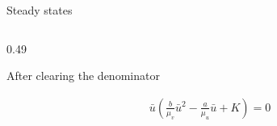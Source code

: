 \begin{frame}{Steady states}
\begin{columns}[c,onlytextwidth]
\begin{column}{0.49\textwidth}
      \vspace{-0.34cm}

      {\color{HydraMuted}\fontsize{7.8}{9.6}\selectfont
        After clearing the denominator
      \par}

      \vspace{-0.22cm}

      {\color{HydraGold}\bfseries\fontsize{10.3}{13}\selectfont
      \begin{align*}
        \boxed{
          \bar u
          \left(
            \frac{b}{\mu_v}\bar u^2
            -
            \frac{a}{\mu_u}\bar u
            +
            K
          \right)
          =
          0
        }
      \end{align*}
      }

    \end{column}

  \end{columns}

  \vspace{-0.12cm}


\end{frame}


